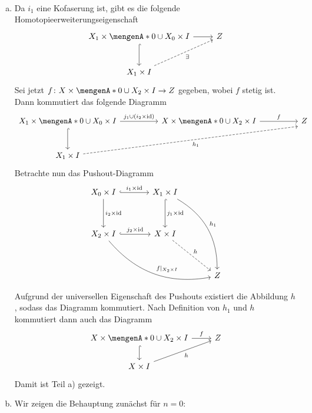 \begin{beweis}
\mbox{ }
\begin{enumerate}[a)]
\item Da $i_1$ eine Kofaserung ist, gibt es die folgende Homotopieerweiterungseigenschaft
\[
	\begin{tikzcd}[row sep=large]
		X_1 \times \set{0} \cup X_0 \times I \rar \dar[hook] & Z \\
		X_1 \times I \urar[dashed,"\exists"'] 
	\end{tikzcd}
\]
Sei jetzt $f \colon X \times \set{0} \cup X_2 \times I \to Z$ gegeben, wobei $f$ stetig ist. Dann kommutiert das folgende Diagramm
\[
	\begin{tikzcd}[column sep=huge,row sep=large]
		X_1 \times \set{0} \cup X_0 \times I \rar["{j_1 \cup (i_2 \times \id)}"] \dar[hook] & X \times \set{0} \cup X_2 \times I \rar["f"] & Z \\
		X_1 \times I \ar[urr, dashed,"h_1"',end anchor=south west] & & 
	\end{tikzcd}
\]
Betrachte nun das Pushout-Diagramm
\[
	\begin{tikzcd}[row sep=3.5em,column sep=large]
		X_0 \times I \rar[hook,"i_1 \times \id"] \dar["i_2 \times \id"] & X_1 \times I \dar["j_1 \times \id",hook] \ar[ddr, bend left,"h_1"] \\
		X_2 \times I \rar[hook,"j_2 \times \id"] \ar[drr, bend right,"f|_{X_2 \times I}"] & X \times I \drar[dashed,"h"] \\
		& & Z
	\end{tikzcd}
\]
Aufgrund der universellen Eigenschaft des Pushouts existiert die Abbildung $h$, sodass das Diagramm kommutiert. Nach Definition von $h_1$ und $h$ kommutiert dann auch 
das Diagramm
\[
	\begin{tikzcd}
		X \times \set{0} \cup X_2 \times I \rar["f"] \dar[hook]& Z \\
		X \times I \urar["h"'] 
	\end{tikzcd}
\]
Damit ist Teil a) gezeigt.
\item Wir zeigen die Behauptung zunächst für $n=0$:
\end{enumerate}
\end{beweis}
